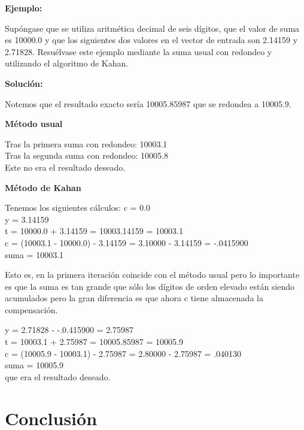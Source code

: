 \documentclass{article}
\theoremstyle{theorem-style}  %
\theoremstyle{definition-style}
\theoremstyle{example-style}
\begin{document}
\textbf{Ejemplo:}

Supóngase que se utiliza aritmética decimal de seis dígitos, que el valor de suma es 10000.0 y que los siguientes dos valores en el vector de entrada son 2.14159 y 2.71828. Resuélvase este ejemplo mediante la suma usual con redondeo y utilizando el algoritmo de Kahan.

\textbf{Solución:}

Notemos que el resultado exacto sería 10005.85987 que se redondea a 10005.9.

\textbf{Método usual}

Tras la primera suma con redondeo: 10003.1 \\
Tras la segunda suma con redondeo: 10005.8 \\
Este no era el resultado deseado.

\textbf{Método de Kahan}

Tenemos los siguientes cálculos:
c = 0.0 \\
y = 3.14159  \\
t = 10000.0 + 3.14159 = 10003.14159 = 10003.1 \\
c = (10003.1 - 10000.0) - 3.14159 = 3.10000 - 3.14159 = -.0415900 \\
suma = 10003.1

Esto es, en la primera iteración coincide con el método usual pero lo importante es que la suma es tan grande que sólo los dígitos de orden elevado están siendo acumulados pero la gran diferencia es que ahora c tiene almacenada la compensación.

y = 2.71828 - -.0.415900 = 2.75987 \\
t = 10003.1 + 2.75987 = 10005.85987 = 10005.9 \\
c = (10005.9 - 10003.1) - 2.75987 = 2.80000 - 2.75987 = .040130 \\
suma = 10005.9 \\

que era el resultado deseado.



\section{Conclusión} \label{sec:conclusion}



\printbibliography
\end{document}
